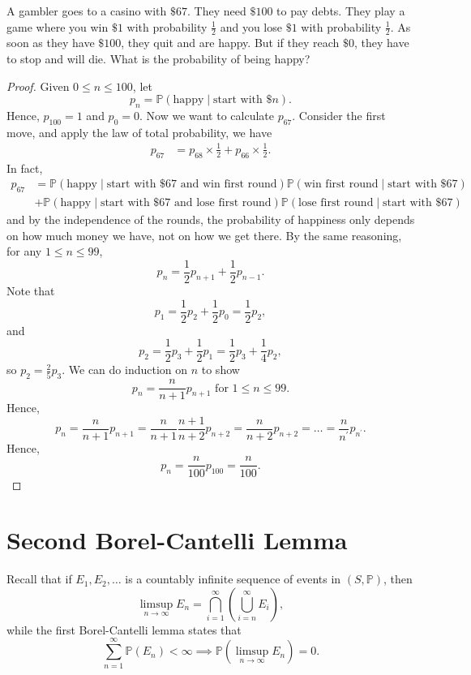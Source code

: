 \begin{eg}
    A gambler goes to a casino with \(\$ 67\). They need \(\$ 100\) to pay debts. They play a game where you win \(\$ 1\) with probability \(\frac{1}{2}\) and you lose \(\$ 1\) with probability \(\frac{1}{2}\). As soon as they have \(\$ 100\), they quit and are happy. But if they reach \(\$ 0\), they have to stop and will die. What is the probability of being happy?        
\end{eg}
\begin{proof}
    Given \(0 \le n \le 100\), let 
    \[
        p_n = \mathbb{P} (\text{happy} \mid \text{start with } \$ n).
    \] 
    Hence, \(p_{100} = 1\) and \(p_0 = 0\). Now we want to calculate \(p_{67} \). Consider the first move, and apply the law of total probability, we have 
    \begin{align*}
        p_{67} &= p_{68} \times \frac{1}{2} + p_{66} \times \frac{1}{2}.
    \end{align*}   
    In fact,
    \begin{align*}
        p_{67} &= \mathbb{P} (\text{happy} \mid \text{start with } \$ 67 \text{ and win first round}) \mathbb{P} (\text{win first round} \mid \text{start with } \$ 67) \\ &+ \mathbb{P} (\text{happy} \mid \text{start with } \$ 67 \text{ and lose first round}) \mathbb{P} (\text{lose first round} \mid \text{start with } \$ 67) 
    \end{align*}
    and by the independence of the rounds, the probability of happiness only depends on how much money we have, not on how we get there. By the same reasoning, for any \(1 \le n \le 99\), 
    \[
        p_n = \frac{1}{2} p_{n+1} + \frac{1}{2} p_{n-1}.
    \] 
    Note that 
    \[
        p_1 = \frac{1}{2} p_2 + \frac{1}{2} p_0 = \frac{1}{2} p_2,
    \]
    and 
    \[
        p_2 = \frac{1}{2} p_3 + \frac{1}{2} p_1 = \frac{1}{2} p_3 + \frac{1}{4} p_2,
    \]
    so \(p_2 = \frac{2}{5} p_3\). We can do induction on \(n\) to show
    \[
        p_n = \frac{n}{n + 1} p_{n+1} \text{ for } 1 \le n \le 99. 
    \]
    Hence,
    \[
        p_n = \frac{n}{n+1} p_{n+1} = \frac{n}{n+1} \frac{n+1}{n+2} p_{n+2} = \frac{n}{n+2} p_{n+2} = \dots = \frac{n}{n^{\prime} } p_{n^{\prime} }.
    \]  
    Hence, 
    \[
        p_n = \frac{n}{100} p_{100} = \frac{n}{100}. 
    \]
\end{proof}

\section{Second Borel-Cantelli Lemma}
Recall that if \(E_1, E_2, \dots \) is a countably infinite sequence of events in \((S, \mathbb{P})\), then 
\[
    \limsup_{n \to \infty} E_n = \bigcap_{i=1}^{\infty} \left( \bigcup_{i=n}^{\infty} E_i \right),   
\]  
while the first Borel-Cantelli lemma states that 
\[
    \sum_{n=1}^{\infty} \mathbb{P} (E_n) < \infty \implies \mathbb{P} (\limsup_{n \to \infty} E_n ) = 0. 
\]

